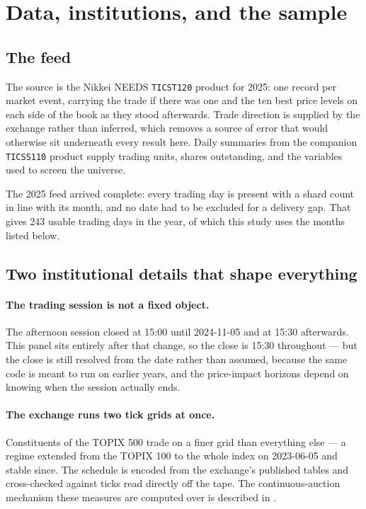 
\section{Data, institutions, and the sample}
\label{sec:data}

\subsection{The feed}

The source is the Nikkei NEEDS \texttt{TICST120} product for 2025:
one record per market event, carrying the trade if there was one and the ten best
price levels on each side of the book as they stood afterwards. Trade direction
is supplied by the exchange rather than inferred, which removes a source of error
that would otherwise sit underneath every result here. Daily summaries from the
companion \texttt{TICSS110} product supply trading units, shares outstanding,
and the variables used to screen the universe.

The 2025 feed arrived complete: every trading day is present with a shard count in line with its month, and no date had to be excluded for a delivery gap. That gives 243 usable trading days in the year, of which this study uses the months listed below.

\subsection{Two institutional details that shape everything}

\paragraph{The trading session is not a fixed object.}
The afternoon session closed at 15:00 until 2024-11-05 and at 15:30 afterwards. This panel sits entirely after that change, so the close is 15:30 throughout --- but the close is still resolved from the date rather than assumed, because the same code is meant to run on earlier years, and the price-impact horizons depend on knowing when the session actually ends.

\paragraph{The exchange runs two tick grids at once.}
Constituents of the TOPIX 500 trade on a finer grid than everything else --- a
regime extended from the TOPIX 100 to the whole index on 2023-06-05 and stable
since. The schedule is encoded from the exchange's published tables
\parencite{JPX2024TickSize} and cross-checked against ticks read directly off
the tape. The continuous-auction mechanism these measures are computed over is
described in \textcite{LehmannModest1994}.

